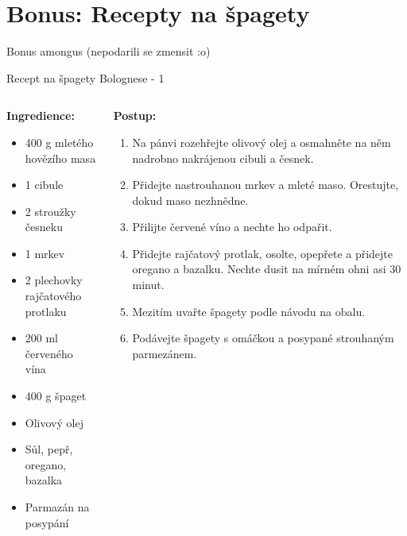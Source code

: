 \documentclass[aspectratio=169,xcolor=dvipsnames, t]{beamer}
\begin{document}
{\section{Bonus: Recepty na špagety}
\begin{frame}{Bonus}
    amongus (nepodarili se zmensit :o)

    \begin{minipage}{0.25\textwidth}
        \centering
    \end{minipage}
\end{frame}
\begin{frame}{Recept na špagety Bolognese - 1}
    \begin{columns}
        \begin{column}{0.5\textwidth}
            \textbf{Ingredience:}
            \tiny{
    \begin{itemize}
        \item 400 g mletého hovězího masa
        \item 1 cibule
        \item 2 stroužky česneku
        \item 1 mrkev
        \item 2 plechovky rajčatového protlaku
        \item 200 ml červeného vína
        \item 400 g špaget
        \item Olivový olej
        \item Sůl, pepř, oregano, bazalka
        \item Parmazán na posypání
    \end{itemize}}
        \end{column}
        \begin{column}{0.5\textwidth}
    \textbf{Postup:}
    \tiny{
    \begin{enumerate}
        \item Na pánvi rozehřejte olivový olej a osmahněte na něm nadrobno nakrájenou cibuli a česnek.
        \item Přidejte nastrouhanou mrkev a mleté maso. Orestujte, dokud maso nezhnědne.
        \item Přilijte červené víno a nechte ho odpařit.
        \item Přidejte rajčatový protlak, osolte, opepřete a přidejte oregano a bazalku. Nechte dusit na mírném ohni asi 30 minut.
        \item Mezitím uvařte špagety podle návodu na obalu.
        \item Podávejte špagety s omáčkou a posypané strouhaným parmezánem.
    \end{enumerate}}
        \end{column}
    \end{columns}
    

\end{frame}}
\end{document}

